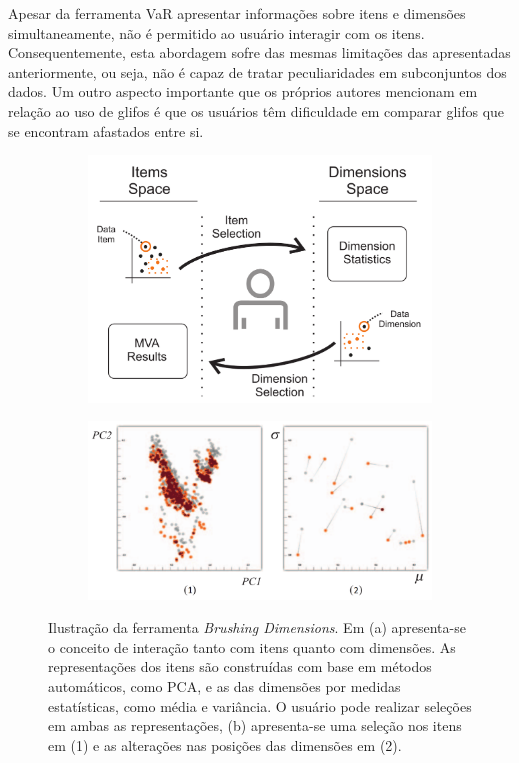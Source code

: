 Apesar da ferramenta VaR apresentar informações sobre itens e
dimensões simultaneamente, não é permitido ao usuário
interagir com os itens. Consequentemente, esta abordagem sofre
das mesmas limitações das apresentadas
anteriormente, ou seja, não é capaz de tratar peculiaridades
em subconjuntos dos dados.  Um outro aspecto importante que
os próprios autores mencionam em relação ao uso 
de glifos é que os usuários têm dificuldade em comparar
glifos que se encontram afastados entre si. 

\begin{figure}[h!]
  \centering
  \begin{subfigure}[b]{0.45\textwidth}
    \centering
    \includegraphics[width=\textwidth]{images/bd1.png}
    \caption{}
    \label{fig:bd1}
  \end{subfigure}%
  \begin{subfigure}[b]{0.55\textwidth}
    \centering
    \includegraphics[width=\textwidth]{images/bd2.png}
    \caption{}
    \label{fig:bd2}
  \end{subfigure}
  \caption[Brushing Dimensions]
  {Ilustração da ferramenta \emph{Brushing Dimensions}. Em
  (a) apresenta-se o conceito de interação tanto com
  itens quanto com dimensões. As representações dos
  itens são construídas com base em métodos automáticos,
  como PCA, e as das dimensões por medidas estatísticas,
  como média e variância. O usuário pode realizar
  seleções em ambas as representações, (b)
  apresenta-se uma seleção nos itens em (1) e as alterações
  nas posições das dimensões em (2).}
  \label{fig:bd}
\end{figure}

